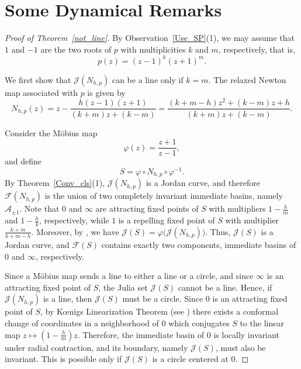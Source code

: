 \documentclass[12pt]{article}
\newtheorem{thm}{Theorem}[section]
\numberwithin{equation}{section}
\begin{document}
\section{Some Dynamical Remarks}\label{Sec_SDR}
\begin{proof}[Proof of Theorem~\ref{not_line}]
By Observation~\ref{Use_SP}(1), we may assume that $1$ and $-1$ are the two roots of $p$ with multiplicities $k$ and $m$, respectively, that is,
$$p(z)=(z-1)^k(z+1)^m.$$
	
We first show that $\mathcal{J}(N_{h,p})$ can be a line only if $k=m$.
The relaxed Newton map associated with $p$ is given by
$$N_{h,p}(z)= z - \frac{h(z-1)(z+1)}{(k+m)z+(k-m)}= \frac{(k+m-h)z^2+(k-m)z+h}{(k+m)z+(k-m)}.	$$
	
Consider the Möbius map
$$\varphi(z)=\frac{z+1}{z-1},$$
and define
$$S=\varphi\circ N_{h,p}\circ \varphi^{-1}.$$
By Theorem~\ref{Conv_cls}(1), $\mathcal{J}(N_{h,p})$ is a Jordan curve, and therefore $\mathcal{F}(N_{h,p})$ is the union of two completely invariant immediate basins, namely $\mathcal{A}_{\pm1}$. Note that $0$ and $\infty$ are attracting fixed points of $S$ with multipliers $1-\frac{h}{m}$ and $1-\frac{h}{k}$, respectively, while $1$ is a repelling fixed point of $S$ with multiplier $\frac{k+m}{k+m-h}$. Moreover, by \cite[Theorem~3.1.4]{Beardon_book}, we have
$\mathcal{J}(S)=\varphi\bigl(\mathcal{J}(N_{h,p})\bigr).$ Thus, $\mathcal{J}(S)$ is a Jordan curve, and $\mathcal{F}(S)$ contains exactly two components, immediate basins of $0$ and $\infty$, respectively.
	
Since a M\"obius map sends a line to either a line or a circle, and since $\infty$ is an attracting fixed point of $S$, the Julia set $\mathcal{J}(S)$ cannot be a line. Hence, if $\mathcal{J}(N_{h,p})$ is a line, then $\mathcal{J}(S)$ must be a circle. Since $0$ is an attracting fixed point of $S$, by K{\oe}nigs Linearization
Theorem (see \cite[Theorem 8.2]{Milnor_book}) there exists a conformal change of coordinates in a neighborhood
of $0$ which conjugates $S$ to the linear map $z\mapsto (1-\frac{h}{m}) z$. Therefore, the immediate basin of $0$ is locally invariant under radial contraction, and its boundary, namely $\mathcal{J}(S)$,
must also be invariant. This is possible only if $\mathcal{J}(S)$ is a
circle centered at $0$.
	

\end{proof}
\end{document}
